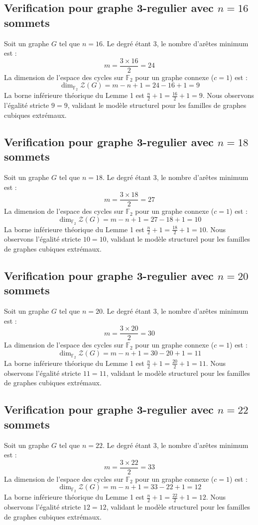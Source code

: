 \documentclass[11pt,a4paper]{article}
\begin{document}
\subsection{Verification pour graphe 3-regulier avec $n=16$ sommets}
Soit un graphe $G$ tel que $n = 16$. Le degré étant 3, le nombre d'arêtes minimum est :
$$ m = \frac{3 \times 16}{2} = 24 $$
La dimension de l'espace des cycles sur $\mathbb{F}_2$ pour un graphe connexe ($c=1$) est :
$$ \dim_{\mathbb{F}_2} \mathcal{Z}(G) = m - n + 1 = 24 - 16 + 1 = 9 $$
La borne inférieure théorique du Lemme 1 est $\frac{n}{2} + 1 = \frac{16}{2} + 1 = 9$.
Nous observons l'égalité stricte $9 = 9$, validant le modèle structurel pour les familles de graphes cubiques extrémaux.

\subsection{Verification pour graphe 3-regulier avec $n=18$ sommets}
Soit un graphe $G$ tel que $n = 18$. Le degré étant 3, le nombre d'arêtes minimum est :
$$ m = \frac{3 \times 18}{2} = 27 $$
La dimension de l'espace des cycles sur $\mathbb{F}_2$ pour un graphe connexe ($c=1$) est :
$$ \dim_{\mathbb{F}_2} \mathcal{Z}(G) = m - n + 1 = 27 - 18 + 1 = 10 $$
La borne inférieure théorique du Lemme 1 est $\frac{n}{2} + 1 = \frac{18}{2} + 1 = 10$.
Nous observons l'égalité stricte $10 = 10$, validant le modèle structurel pour les familles de graphes cubiques extrémaux.

\subsection{Verification pour graphe 3-regulier avec $n=20$ sommets}
Soit un graphe $G$ tel que $n = 20$. Le degré étant 3, le nombre d'arêtes minimum est :
$$ m = \frac{3 \times 20}{2} = 30 $$
La dimension de l'espace des cycles sur $\mathbb{F}_2$ pour un graphe connexe ($c=1$) est :
$$ \dim_{\mathbb{F}_2} \mathcal{Z}(G) = m - n + 1 = 30 - 20 + 1 = 11 $$
La borne inférieure théorique du Lemme 1 est $\frac{n}{2} + 1 = \frac{20}{2} + 1 = 11$.
Nous observons l'égalité stricte $11 = 11$, validant le modèle structurel pour les familles de graphes cubiques extrémaux.

\subsection{Verification pour graphe 3-regulier avec $n=22$ sommets}
Soit un graphe $G$ tel que $n = 22$. Le degré étant 3, le nombre d'arêtes minimum est :
$$ m = \frac{3 \times 22}{2} = 33 $$
La dimension de l'espace des cycles sur $\mathbb{F}_2$ pour un graphe connexe ($c=1$) est :
$$ \dim_{\mathbb{F}_2} \mathcal{Z}(G) = m - n + 1 = 33 - 22 + 1 = 12 $$
La borne inférieure théorique du Lemme 1 est $\frac{n}{2} + 1 = \frac{22}{2} + 1 = 12$.
Nous observons l'égalité stricte $12 = 12$, validant le modèle structurel pour les familles de graphes cubiques extrémaux.
\end{document}
